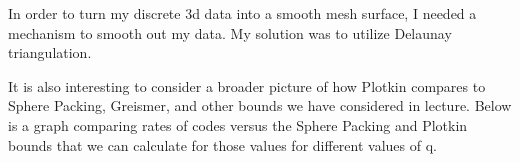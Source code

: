\documentclass{article}
\numberwithin{theorem}{subsection}
\numberwithin{lemma}{subsection}
\theoremstyle{definition}
\numberwithin{exmp}{subsection}
\theoremstyle{definition}
\numberwithin{defn}{subsection}
\theoremstyle{definition}
\numberwithin{claim}{subsection}
\begin{document}
In order to turn my discrete 3d data into a smooth mesh surface, I needed a mechanism to smooth out my data.  My solution was to utilize Delaunay triangulation.

It is also interesting to consider a broader picture of how Plotkin compares to Sphere Packing, Greismer, and other bounds we have considered in lecture.  Below is a graph comparing rates of codes versus the Sphere Packing and Plotkin bounds
that we can calculate for those values for different values of q.  

\end{document}
